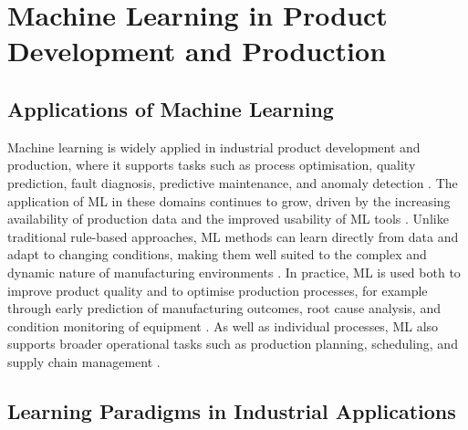 \section{Machine Learning in Product Development and Production}

\subsection{Applications of Machine Learning}

Machine learning is widely applied in industrial product development and production, 
where it supports tasks such as process optimisation, quality prediction, fault diagnosis, 
predictive maintenance, and anomaly detection 
\parencite{wuest2016ml_manufacturing, plathottam2023review_ai_manufacturing}. 
The application of ML in these domains continues to grow, 
driven by the increasing availability of production data and the improved usability of ML tools 
\parencite{wuest2016ml_manufacturing}. 
Unlike traditional rule-based approaches, ML methods can learn directly from data 
and adapt to changing conditions, making them well suited to the complex and dynamic 
nature of manufacturing environments \parencite{wuest2016ml_manufacturing}. 
In practice, ML is used both to improve product quality and to optimise production processes, 
for example through early prediction of manufacturing outcomes, root cause analysis, 
and condition monitoring of equipment \parencite{weichert2019review_ml_optimization_production}. 
As well as individual processes, ML also supports broader operational tasks such as 
production planning, scheduling, and supply chain management 
\parencite{plathottam2023review_ai_manufacturing, presciuttini2024ml_iot_manufacturing_operations}.

\subsection{Learning Paradigms in Industrial Applications}

